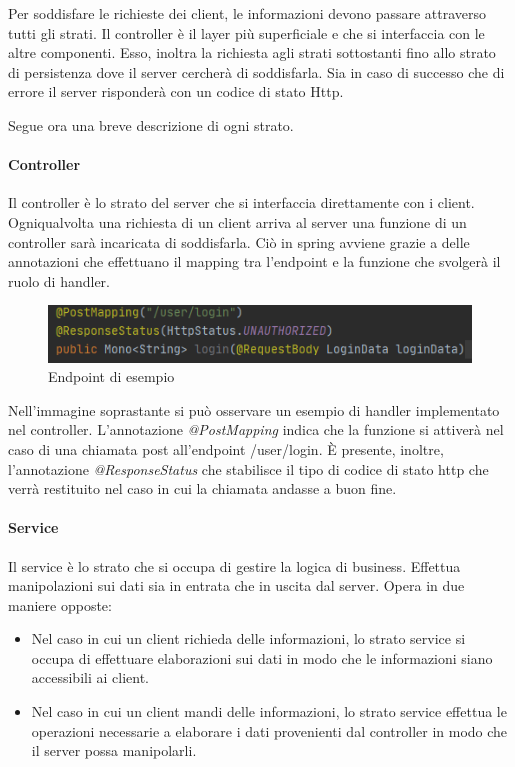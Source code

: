 \documentclass[../manuale-sviluppatore.tex]{subfiles}
\begin{document}
Per soddisfare le richieste dei client, le informazioni devono passare attraverso tutti gli strati.
Il controller è il layer più superficiale e che si interfaccia con le altre componenti.
Esso, inoltra la richiesta agli strati sottostanti fino allo strato di persistenza dove il server cercherà di soddisfarla.
Sia in caso di successo che di errore il server risponderà con un codice di stato Http.

Segue ora una breve descrizione di ogni strato.

\paragraph{Controller}%
\label{par:controller}

Il controller è lo strato del server che si interfaccia direttamente con i client.
Ogniqualvolta una richiesta di un client arriva al server una funzione di un controller sarà incaricata di soddisfarla.
Ciò in spring avviene grazie a delle annotazioni che effettuano il mapping tra l'endpoint e la funzione che svolgerà il ruolo di handler.

\begin{figure}[H]
  \centering
  \includegraphics{img/controller-image.png}
  \caption{Endpoint di esempio}%
   \label{fig:immagine che illustra un endpoint di esempio}
\end{figure}

Nell'immagine soprastante si può osservare un esempio di handler implementato nel controller.
L'annotazione \textit{@PostMapping} indica che la funzione si attiverà nel caso di una chiamata post all'endpoint /user/login.
È presente, inoltre, l'annotazione \textit{@ResponseStatus} che stabilisce il tipo di codice di stato http che verrà restituito nel caso in cui la chiamata andasse a buon fine.

\paragraph{Service}%
\label{par:service}

Il service è lo strato che si occupa di gestire la logica di business.
Effettua manipolazioni sui dati sia in entrata che in uscita dal server.
Opera in due maniere opposte:
\begin{itemize}
  \item Nel caso in cui un client richieda delle informazioni, lo strato service si occupa di effettuare elaborazioni sui dati in modo che le informazioni siano accessibili ai client.
  \item Nel caso in cui un client mandi delle informazioni, lo strato service effettua le operazioni necessarie a elaborare i dati provenienti dal controller in modo che il server possa manipolarli.
\end{itemize}
\end{document}
